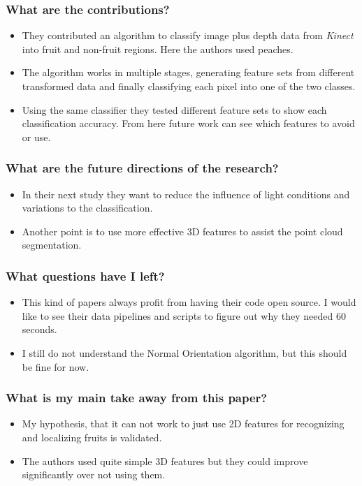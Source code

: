 \documentclass{article}
\begin{document}
\subsubsection*{What are the contributions?}
\begin{itemize}
    \item They contributed an algorithm to classify image plus depth data from \emph{Kinect} into fruit and non-fruit regions. Here the authors used peaches. 
    \item The algorithm works in multiple stages, generating feature sets from different transformed data and finally classifying each pixel into one of the two classes.
    \item Using the same classifier they tested different feature sets to show each classification accuracy. From here future work can see which features to avoid or use.
\end{itemize}
\subsubsection*{What are the future directions of the research?}
\begin{itemize}
    \item In their next study they want to reduce the influence of light conditions and variations to the classification. 
    \item Another point is to use more effective 3D features to assist the point cloud segmentation.
\end{itemize}
\subsubsection*{What questions have I left?}
\begin{itemize}
    \item This kind of papers always profit from having their code open source. I would like to see their data pipelines and scripts to figure out why they needed 60 seconds.
    \item I still do not understand the Normal Orientation algorithm, but this should be fine for now.
\end{itemize}
\subsubsection*{What is my main take away from this paper?}
\begin{itemize}
    \item My hypothesis, that it can not work to just use 2D features for recognizing and localizing fruits is validated.\
    \item The  authors used quite simple 3D features but they could improve significantly over not using them. 
\end{itemize}
\end{document}
